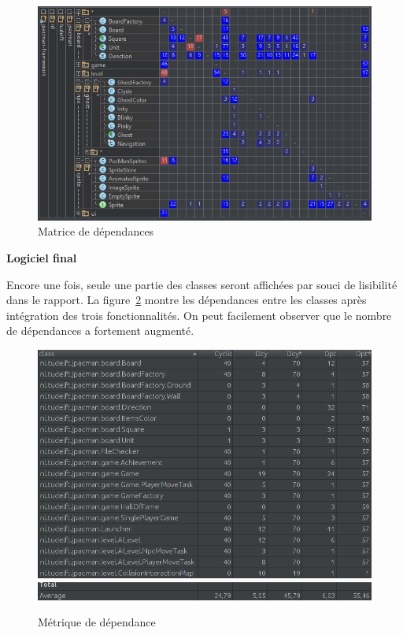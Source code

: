 \documentclass[12pt, openany]{report}
\begin{document}
\begin{figure}[!h]
	\centering
	\includegraphics[scale=0.5]{Images/DependencyMatrix1.JPG}
	\caption{Matrice de dépendances}
	\label{DependencyMatrix1}
\end{figure} 



\textbf{Logiciel final}

Encore une fois, seule une partie des classes seront affichées par souci de lisibilité dans le rapport. La figure~\ref{DependencyMetricsFinal1} montre les dépendances entre les classes après intégration des trois fonctionnalités. On peut facilement observer que le nombre de dépendances a fortement augmenté.

\begin{figure}[!h]
	\centering
	\includegraphics[scale=0.6]{Images/MetricsDependencyFinal1.png}  
	\includegraphics[scale=0.6]{Images/MetricsDependencyFinal2.png} 
	\caption{Métrique de dépendance}
	\label{DependencyMetricsFinal1}
\end{figure}
\end{document}
